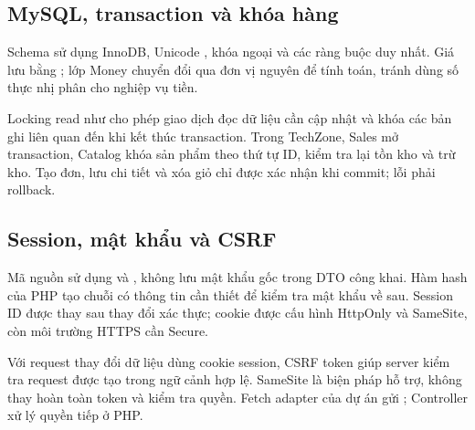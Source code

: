 \subsection{MySQL, transaction và khóa hàng}
Schema sử dụng InnoDB, Unicode , khóa ngoại và các ràng buộc duy nhất. Giá lưu bằng ; lớp Money chuyển đổi qua đơn vị nguyên để tính toán, tránh dùng số thực nhị phân cho nghiệp vụ tiền.

Locking read như  cho phép giao dịch đọc dữ liệu cần cập nhật và khóa các bản ghi liên quan đến khi kết thúc transaction.\cite{mysql-locking} Trong TechZone, Sales mở transaction, Catalog khóa sản phẩm theo thứ tự ID, kiểm tra lại tồn kho và trừ kho. Tạo đơn, lưu chi tiết và xóa giỏ chỉ được xác nhận khi commit; lỗi phải rollback.

\subsection{Session, mật khẩu và CSRF}
Mã nguồn sử dụng  và , không lưu mật khẩu gốc trong DTO công khai. Hàm hash của PHP tạo chuỗi có thông tin cần thiết để kiểm tra mật khẩu về sau.\cite{php-password} Session ID được thay sau thay đổi xác thực; cookie được cấu hình HttpOnly và SameSite, còn môi trường HTTPS cần Secure.

Với request thay đổi dữ liệu dùng cookie session, CSRF token giúp server kiểm tra request được tạo trong ngữ cảnh hợp lệ. SameSite là biện pháp hỗ trợ, không thay hoàn toàn token và kiểm tra quyền.\cite{owasp-csrf} Fetch adapter của dự án gửi ; Controller xử lý quyền tiếp ở PHP.

